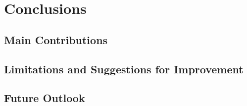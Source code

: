 \chapter{Conclusions} 
\label{chap:conclusions}

\section{Main Contributions}

\section{Limitations and Suggestions for Improvement}

\section{Future Outlook}
